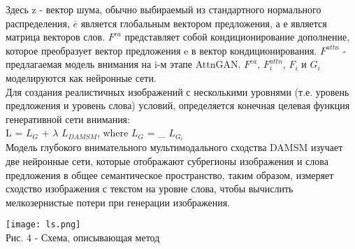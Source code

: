 \documentclass{article}
\begin{document}
Здесь z - вектор шума, обычно выбираемый из стандартного нормального распределения, $\overline{e}$ является глобальным вектором предложения, а е является матрица векторов слов. $F^{ca}$ представляет собой кондиционирование
дополнение, которое преобразует вектор предложения e в
вектор кондиционирования. $F^{attn}$ - предлагаемая модель внимания на i-м этапе AttnGAN. $F^{ca}$, $F^{attn}_{i} $, $F_{i}$ и $G_{i}$ моделируются как нейронные сети.\\
Для создания реалистичных изображений с несколькими уровнями (т.е.
уровень предложения и уровень слова) условий, определяется конечная целевая функция генеративной сети внимания:\\
L = $L_{G}$ + $\lambda$ $L_{DAMSM}$, where $L_{G}$ = \sum_{} 
 $L_{G_{i}}$\\
 
 Модель глубокого внимательного мультимодального сходства
DAMSM изучает две нейронные сети, которые отображают субрегионы изображения и слова предложения в общее семантическое пространство, таким образом, измеряет сходство изображения с текстом на уровне слова, чтобы вычислить мелкозернистые потери при генерации изображения.
\\
 \begin{center} 
  \texttt{[image: ls.png]}
  \\
  \caption*{Рис. 4 - Схема, описывающая метод}
  \end{center} 
\end{document}
